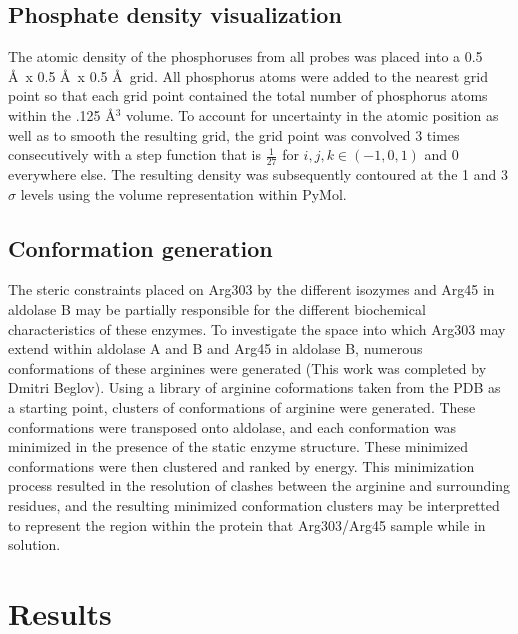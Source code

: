 \documentclass[11pt,a4paper]{article}
\begin{document}
\subsection{Phosphate density visualization} 
The atomic density of the phosphoruses from all probes was placed into a 0.5 \AA\ x 0.5 \AA\ x 0.5 \AA\ grid. All
phosphorus atoms were added to the nearest grid point so that each grid point contained the 
total number of phosphorus atoms within the .125 \AA${}^3$ volume. To account for 
uncertainty in the atomic position as well as to smooth the resulting grid, 
the grid point was convolved 3 times consecutively with a step function that is 
$\frac{1}{27}$ for $i,j,k \in (-1,0,1)$ and 0 everywhere else.
The resulting density was subsequently contoured at the 1 and 3 $\sigma$ levels
using the volume representation within PyMol.

\subsection{Conformation generation}
The steric constraints placed on Arg303 by the different isozymes and Arg45 in aldolase B may be partially responsible for the different
biochemical characteristics of these enzymes.  To investigate the space into which Arg303 may extend within aldolase A
and B and Arg45 in aldolase B, numerous conformations of these arginines were generated (This work was completed by Dmitri Beglov).  Using a
library of arginine coformations taken from the PDB as a starting point, clusters of conformations of arginine were generated.  These
conformations were transposed onto aldolase, and each conformation was minimized in the presence of the static enzyme structure.  
These minimized conformations were then clustered and ranked by energy.  This
minimization process resulted in the resolution of clashes between the arginine and surrounding residues, and the resulting minimized
conformation clusters may be interpretted to represent the region within the protein that Arg303/Arg45 sample while in solution.    

\section{Results}
\end{document}
